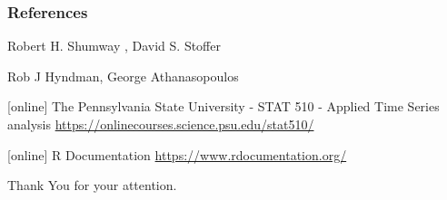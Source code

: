 \documentclass{beamer}
\begin{document}
\begin{frame}[allowframebreaks]
\frametitle<presentation>{References}	
\begin{thebibliography}{10}
			


\beamertemplatebookbibitems			
\bibitem{}
Robert H. Shumway , David S. Stoffer


\beamertemplatebookbibitems			
\bibitem{}
Rob J Hyndman, George Athana­sopou­los
			
[online]
\bibitem{}
The Pennsylvania State University - STAT 510 - Applied Time Series analysis
\newblock {\em }
\newblock \url{https://onlinecourses.science.psu.edu/stat510/}	
			
[online]
\bibitem{}
R Documentation
\newblock \url{https://www.rdocumentation.org/}	 						
			
\end{thebibliography}
\end{frame}

\begin{frame}
\centering
Thank You for your attention. 
\end{frame}
\end{document}
